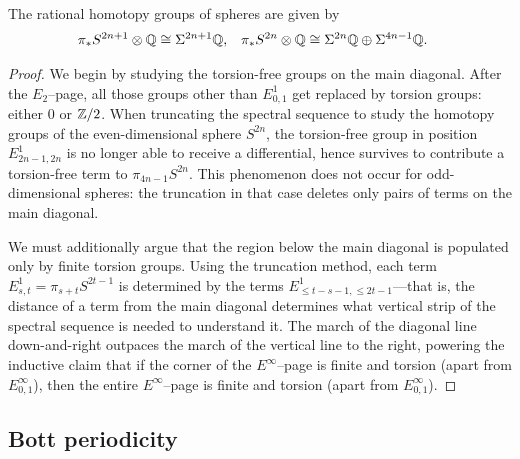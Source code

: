 \begin{corollary}
The rational homotopy groups of spheres are given by
\begin{align*}
\pi_* S^{2n+1} \otimes \mathbb Q & \cong \Sigma^{2n+1} \mathbb Q, &
\pi_* S^{2n} \otimes \mathbb Q & \cong \Sigma^{2n} \mathbb Q \oplus \Sigma^{4n-1} \mathbb Q.
\end{align*}
\end{corollary}
\begin{proof}
We begin by studying the torsion-free groups on the main diagonal.
After the $E_2$--page, all those groups other than $E^1_{0,1}$ get replaced by torsion groups: either $0$ or $\mathbb Z/2$.
When truncating the spectral sequence to study the homotopy groups of the even-dimensional sphere $S^{2n}$, the torsion-free group in position $E^1_{2n-1, 2n}$ is no longer able to receive a differential, hence survives to contribute a torsion-free term to $\pi_{4n-1} S^{2n}$.
This phenomenon does not occur for odd-dimensional spheres: the truncation in that case deletes only pairs of terms on the main diagonal.

We must additionally argue that the region below the main diagonal is populated only by finite torsion groups.
Using the truncation method, each term $E^1_{s, t} = \pi_{s+t} S^{2t-1}$ is determined by the terms $E^1_{\le t-s-1, \le 2t-1}$---that is, the distance of a term from the main diagonal determines what vertical strip of the spectral sequence is needed to understand it.
The march of the diagonal line down-and-right outpaces the march of the vertical line to the right, powering the inductive claim that if the corner of the $E^\infty$--page is finite and torsion (apart from $E^\infty_{0,1}$), then the entire $E^\infty$--page is finite and torsion (apart from $E^\infty_{0,1}$).
\end{proof}



\begin{subappendices}

\section{Bott periodicity}

\end{subappendices}
